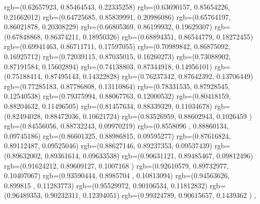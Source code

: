 {{{		  rgb=(0.62657923,  0.85464543,  0.22335258)
		  rgb=(0.63690157,  0.85654226,  0.21662012)
		  rgb=(0.64725685,  0.85839991,  0.20986086)
		  rgb=(0.65764197,  0.86021878,  0.20308229)
		  rgb=(0.66805369,  0.86199932,  0.19629307)
		  rgb=(0.67848868,  0.86374211,  0.18950326)
		  rgb=(0.68894351,  0.86544779,  0.18272455)
		  rgb=(0.69941463,  0.86711711,  0.17597055)
		  rgb=(0.70989842,  0.86875092,  0.16925712)
		  rgb=(0.72039115,  0.87035015,  0.16260273)
		  rgb=(0.73088902,  0.87191584,  0.15602894)
		  rgb=(0.74138803,  0.87344918,  0.14956101)
		  rgb=(0.75188414,  0.87495143,  0.14322828)
		  rgb=(0.76237342,  0.87642392,  0.13706449)
		  rgb=(0.77285183,  0.87786808,  0.13110864)
		  rgb=(0.78331535,  0.87928545,  0.12540538)
		  rgb=(0.79375994,  0.88067763,  0.12000532)
		  rgb=(0.80418159,  0.88204632,  0.11496505)
		  rgb=(0.81457634,  0.88339329,  0.11034678)
		  rgb=(0.82494028,  0.88472036,  0.10621724)
		  rgb=(0.83526959,  0.88602943,  0.1026459 )
		  rgb=(0.84556056,  0.88732243,  0.09970219)
		  rgb=(0.8558096 ,  0.88860134,  0.09745186)
		  rgb=(0.86601325,  0.88986815,  0.09595277)
		  rgb=(0.87616824,  0.89112487,  0.09525046)
		  rgb=(0.88627146,  0.89237353,  0.09537439)
		  rgb=(0.89632002,  0.89361614,  0.09633538)
		  rgb=(0.90631121,  0.89485467,  0.09812496)
		  rgb=(0.91624212,  0.89609127,  0.1007168 )
		  rgb=(0.92610579,  0.89732977,  0.10407067)
		  rgb=(0.93590444,  0.8985704 ,  0.10813094)
		  rgb=(0.94563626,  0.899815  ,  0.11283773)
		  rgb=(0.95529972,  0.90106534,  0.11812832)
		  rgb=(0.96489353,  0.90232311,  0.12394051)
		  rgb=(0.99324789,  0.90615657,  0.1439362 )
		},
	}
}